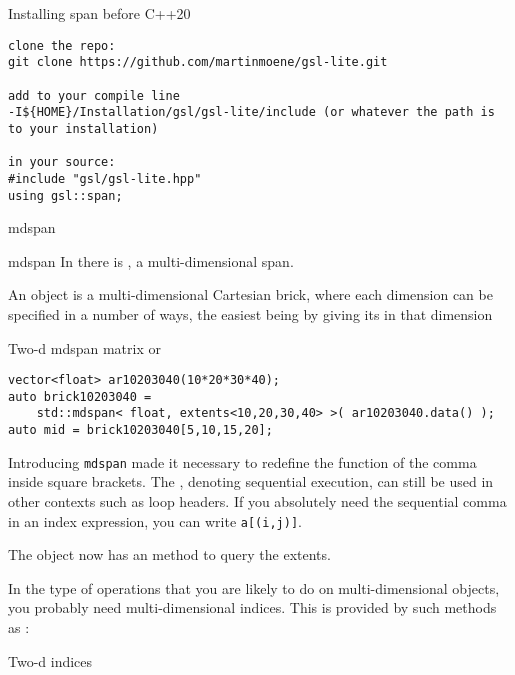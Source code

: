 
 {Installing span before C++20}

\begin{verbatim}
clone the repo: 
git clone https://github.com/martinmoene/gsl-lite.git

add to your compile line 
-I${HOME}/Installation/gsl/gsl-lite/include (or whatever the path is to your installation)

in your source:
#include "gsl/gsl-lite.hpp"
using gsl::span;
\end{verbatim}

 {mdspan}


\begin{plainblock}{mdspan}
  In  there is ,
  a multi-dimensional span.
\end{plainblock}

An  object is a multi-dimensional Cartesian brick,
where each dimension can be specified in a number of ways,
the easiest being by giving its  in that dimension

\begin{block}{Two-d mdspan matrix}
or 
\begin{lstlisting}
vector<float> ar10203040(10*20*30*40);
auto brick10203040 =
    std::mdspan< float, extents<10,20,30,40> >( ar10203040.data() );
auto mid = brick10203040[5,10,15,20];
\end{lstlisting}
\end{block}

\begin{remark}
  Introducing \lstinline{mdspan} made it necessary
  to redefine the
  function of the comma inside square brackets.
  The , denoting sequential execution,
  can still be used in other contexts such as loop headers.
  If you absolutely need the sequential comma in an index expression,
  you can write \lstinline+a[(i,j)]+.
\end{remark}

The object now has an  method to query the extents.

In the type of operations that you are likely to do on multi-dimensional objects,
you probably need multi-dimensional indices.
This is provided by such methods as :

\begin{block}{Two-d indices}
\end{block}

